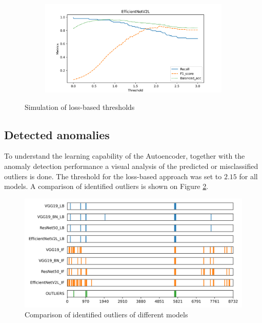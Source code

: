 \begin{figure}[H]
\begin{subfigure}{0.48\textwidth}
    \end{subfigure}
    \begin{subfigure}{0.48\textwidth}
        \centering
        \includegraphics[width=\textwidth]{./results/comparison/EfficientNetV2L_threshold.png}
    \end{subfigure}
    \caption{Simulation of loss-based thresholds}
    \label{fig:threshold_simulation}
\end{figure}

\subsection{Detected anomalies}
To understand the learning capability of the Autoencoder, together with the anomaly detection
performance a visual analysis of the predicted or misclassified outliers is done.
The threshold for the loss-based approach was set to $2.15$ for all models.
A comparison of identified outliers is shown on Figure \ref{fig:outlier_comparison}.

\begin{figure}[H]
    \centering
    \includegraphics[width=\textwidth]{./results/comparison/outlier_comparison.png}
    \caption{Comparison of identified outliers of different models}
    \label{fig:outlier_comparison}
\end{figure}

